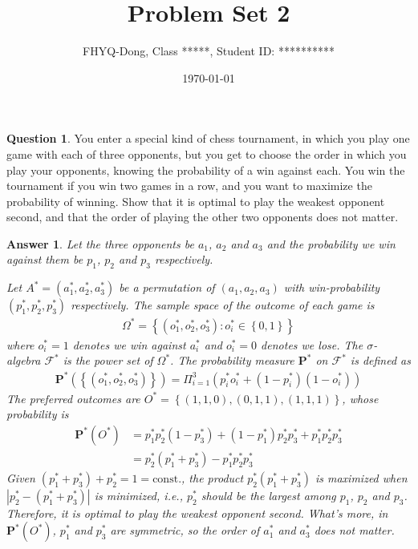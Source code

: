 \documentclass[utf8]{article}
\title{Problem Set 2}
\author{ FHYQ-Dong, Class *****, Student ID: ********** }
\date{\today}
\theoremstyle{definition}%
\newtheorem{question}{Question} %
\theoremstyle{plain}%
\newtheorem{answer}{Answer} %
\begin{document}
\maketitle
\thispagestyle{fancy}

\begin{question}
    You enter a special kind of chess tournament, in which you play one game with each of three opponents, but you get to choose the order in which you play your opponents, knowing the probability of a win against each. You win the tournament if you win two games in a row, and you want to maximize the probability of winning. Show that it is optimal to play the weakest opponent second, and that the order of playing the other two opponents does not matter.
\end{question}
\begin{answer}
    Let the three opponents be $a_1$, $a_2$ and $a_3$ and the probability we win against them be $p_1$, $p_2$ and $p_3$ respectively. 
    
    Let $A^* = \left(a^*_1, a^*_2, a^*_3\right)$ be a permutation of $\left(a_1, a_2, a_3\right)$ with win-probability $\left(p^*_1, p^*_2, p^*_3\right)$ respectively. The sample space of the outcome of each game is 
    \begin{align*}
        \varOmega^* = \left\{\left(o^*_1, o^*_2, o^*_3\right) : o^*_i \in \left\{0, 1\right\}\right\}
    \end{align*}
    where $o^*_i = 1$ denotes we win against $a^*_i$ and $o^*_i = 0$ denotes we lose. The $\sigma$-algebra $\mathcal{F^*}$ is the power set of $\varOmega^*$. The probability measure $\mathbf{P^*}$ on $\mathcal{F^*}$ is defined as 
    \begin{align*}
        \mathbf{P^*}\left(\left\{\left(o^*_1, o^*_2, o^*_3\right)\right\}\right) = \Pi_{i = 1}^{3} \left(p^*_i o^*_i + \left(1 - p^*_i\right) \left(1 - o^*_i\right)\right)
    \end{align*}
    The preferred outcomes are $O^* = \left\{\left(1, 1, 0\right), \left(0, 1, 1\right), \left(1, 1, 1\right)\right\}$, whose probability is
    \begin{align*}
        \mathbf{P^*}\left(O^*\right) &= p^*_1 p^*_2 \left(1 - p^*_3\right) + \left(1 - p^*_1\right) p^*_2 p^*_3 + p^*_1 p^*_2 p^*_3 \\
        &= p^*_2 \left(p^*_1 + p^*_3 \right) - p^*_1 p^*_2 p^*_3
    \end{align*}
    Given $\left(p^*_1 + p^*_3 \right) + p^*_2 = 1 = \mathrm{const.}$, the product $p^*_2 \left(p^*_1 + p^*_3 \right)$ is maximized when $| p^*_2 - \left(p^*_1 + p^*_3 \right) |$ is minimized, i.e., $p^*_2$ should be the largest among $p_1$, $p_2$ and $p_3$. Therefore, it is optimal to play the weakest opponent second. What's more, in $\mathbf{P^*}\left(O^*\right)$, $p^*_1$ and $p^*_3$ are symmetric, so the order of $a^*_1$ and $a^*_3$ does not matter.
\end{answer}
\end{document}
